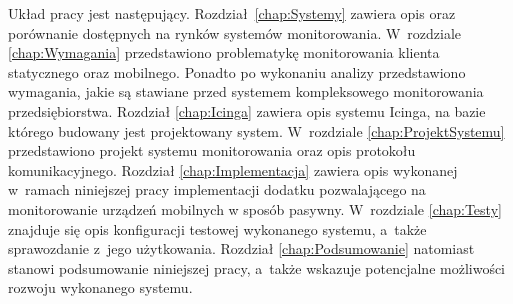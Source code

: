 Układ pracy jest następujący. Rozdział~\ref{chap:Systemy} zawiera opis
oraz porównanie dostępnych na rynków systemów
monitorowania. W~rozdziale \ref{chap:Wymagania} przedstawiono
problematykę monitorowania klienta statycznego oraz mobilnego. Ponadto
po wykonaniu analizy przedstawiono wymagania, jakie są stawiane przed
systemem kompleksowego monitorowania przedsiębiorstwa. Rozdział
\ref{chap:Icinga} zawiera opis systemu Icinga, na bazie którego
budowany jest projektowany system. W~rozdziale
\ref{chap:ProjektSystemu} przedstawiono projekt systemu monitorowania
oraz opis protokołu komunikacyjnego. Rozdział \ref{chap:Implementacja}
zawiera opis wykonanej w~ramach niniejszej pracy implementacji dodatku
pozwalającego na monitorowanie urządzeń mobilnych w sposób
pasywny. W~rozdziale \ref{chap:Testy} znajduje się opis konfiguracji
testowej wykonanego systemu, a~także sprawozdanie z~jego
użytkowania. Rozdział \ref{chap:Podsumowanie} natomiast stanowi
podsumowanie niniejszej pracy, a~także wskazuje potencjalne możliwości
rozwoju wykonanego systemu.
